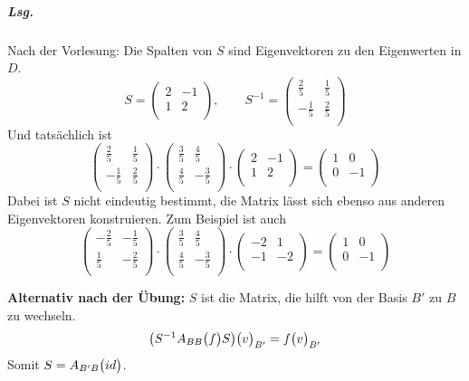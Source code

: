 \documentclass{scrreprt}
\begin{document}
\begin{enumerate}[(a)]
  \subparagraph{Lsg.} Nach der Vorlesung: Die Spalten von $S$ sind Eigenvektoren
  zu den Eigenwerten in $D$.
  \[
    S = \begin{pmatrix}
      2 & - 1 \\
      1 & 2   \\
    \end{pmatrix}, \qquad S^{-1} = \begin{pmatrix}
      \frac{2}{5}  & \frac{1}{5} \\
      -\frac{1}{5} & \frac{2}{5} \\
    \end{pmatrix}
  \]
  Und tatsächlich ist
  \[
    \begin{pmatrix}
      \frac{2}{5}  & \frac{1}{5} \\
      -\frac{1}{5} & \frac{2}{5} \\
    \end{pmatrix} \cdot \begin{pmatrix}
      \frac{3}{5} & \frac{4}{5}  \\
      \frac{4}{5} & -\frac{3}{5} \\
    \end{pmatrix} \cdot \begin{pmatrix}
      2 & -1 \\
      1 & 2  \\
    \end{pmatrix} = \begin{pmatrix}
      1 & 0  \\
      0 & -1 \\
    \end{pmatrix}
  \]
  Dabei ist $S$ nicht eindeutig bestimmt, die Matrix lässt sich ebenso aus
  anderen Eigenvektoren konstruieren.
  Zum Beispiel ist auch
  \[
    \begin{pmatrix}
      -\frac{2}{5} & -\frac{1}{5} \\
      \frac{1}{5}  & -\frac{2}{5} \\
    \end{pmatrix} \cdot \begin{pmatrix}
      \frac{3}{5} & \frac{4}{5}  \\
      \frac{4}{5} & -\frac{3}{5} \\
    \end{pmatrix} \cdot \begin{pmatrix}
      -2 & 1  \\
      -1 & -2 \\
    \end{pmatrix} = \begin{pmatrix}
      1 & 0  \\
      0 & -1 \\
    \end{pmatrix}
  \]

  \textbf{Alternativ nach der Übung:} $S$ ist die Matrix, die hilft von der
  Basis $B'$ zu $B$ zu wechseln.
  \[
    \qty(S^{-1}A_{BB}\qty\big(f)S)\qty\big(v)_{B'} = f\qty\big(v)_{B'}
  \]
  Somit $S = A_{B'B}\qty\big(id)$.
\end{enumerate}
\end{document}
